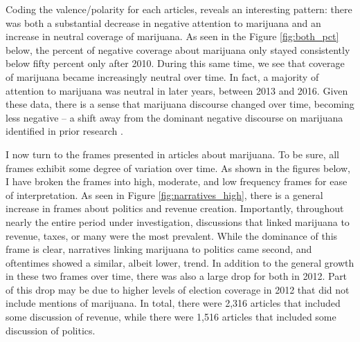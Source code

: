 Coding the valence/polarity for each articles, reveals an interesting pattern: there was both a substantial decrease in negative attention to marijuana and an increase in neutral coverage of marijuana. As seen in the Figure \ref{fig:both_pct} below, the percent of negative coverage about marijuana only stayed consistently below fifty percent only after 2010. %
During this same time, we see that coverage of marijuana became increasingly neutral over time. In fact, a majority of attention to marijuana was neutral in later years, between 2013 and 2016. Given these data, there is a sense that marijuana discourse changed over time, becoming less negative -- a shift away from the dominant negative discourse on marijuana identified in prior research \citep{mosher_and_akins_2019,bonnie_and_whitebread_1970}. 




%

%

I now turn to the frames presented in articles about marijuana. To be sure, all frames exhibit some degree of variation over time. As shown in the figures below, I have broken the frames into high, moderate, and low frequency frames for ease of interpretation. As seen in Figure \ref{fig:narratives_high}, there is a general increase in frames about politics and revenue creation.  Importantly, throughout nearly the entire period under investigation, discussions that linked marijuana to revenue, taxes, or many were the most prevalent. While the dominance of this frame is clear, narratives linking marijuana to politics came second, and oftentimes showed a similar, albeit lower, trend. In addition to the general growth in these two frames over time, there was also a large drop for both in 2012. Part of this drop may be due to higher levels of election coverage in 2012 that did not include mentions of marijuana. In total, there were 2,316 articles that included some discussion of revenue, while there were 1,516 articles that included some discussion of politics. 

